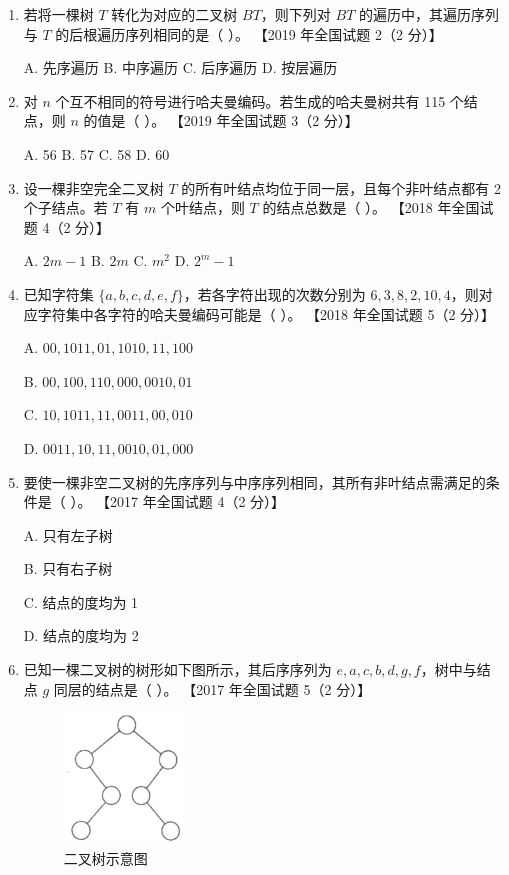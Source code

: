 \documentclass[lang=cn,newtx,10pt,scheme=chinese]{elegantbook}
\begin{document}
\begin{enumerate}
    \item 若将一棵树 $T$ 转化为对应的二叉树 $BT$，则下列对 $BT$ 的遍历中，其遍历序列与 $T$ 的后根遍历序列相同的是（ ）。  
    【2019 年全国试题 2（2 分）】  

    A. 先序遍历 \quad B. 中序遍历 \quad C. 后序遍历 \quad D. 按层遍历  

    \item 对 $n$ 个互不相同的符号进行哈夫曼编码。若生成的哈夫曼树共有 115 个结点，则 $n$ 的值是（ ）。  
    【2019 年全国试题 3（2 分）】  

    A. 56 \quad B. 57 \quad C. 58 \quad D. 60  

    \item 设一棵非空完全二叉树 $T$ 的所有叶结点均位于同一层，且每个非叶结点都有 2 个子结点。若 $T$ 有 $m$ 个叶结点，则 $T$ 的结点总数是（ ）。  
    【2018 年全国试题 4（2 分）】

    A. $2m - 1$ \quad B. $2m$ \quad C. $m^2$ \quad D. $2^{m} - 1$  

    \item 已知字符集 $\{a, b, c, d, e, f\}$，若各字符出现的次数分别为 $6, 3, 8, 2, 10, 4$，则对应字符集中各字符的哈夫曼编码可能是（ ）。  
    【2018 年全国试题 5（2 分）】  

    A. $00, 1011, 01, 1010, 11, 100$  

    B. $00, 100, 110, 000, 0010, 01$  

    C. $10, 1011, 11, 0011, 00, 010$  

    D. $0011, 10, 11, 0010, 01, 000$  

    \item 要使一棵非空二叉树的先序序列与中序序列相同，其所有非叶结点需满足的条件是（ ）。  
    【2017 年全国试题 4（2 分）】  



    A. 只有左子树  

    B. 只有右子树  




    C. 结点的度均为 1  

    D. 结点的度均为 2  

    \item 已知一棵二叉树的树形如下图所示，其后序序列为 $e, a, c, b, d, g, f$，树中与结点 $g$ 同层的结点是（ ）。  
    【2017 年全国试题 5（2 分）】  

    \begin{figure}[h!]
            \centering
            \includegraphics[width=0.3\textwidth]{./figure/exercisePicPDF/chapter6/6-6.pdf}
            \caption{二叉树示意图}
    \end{figure}


\end{enumerate}
\end{document}
